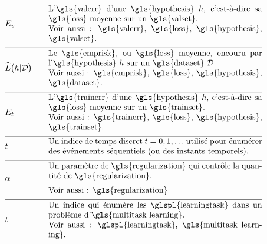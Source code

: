 \begin{align}
	& \valerror & \quad & \parbox{.75\textwidth}{L'\gls{valerr} d’une \gls{hypothesis} $\hypothesis$, c’est-à-dire sa \gls{loss} moyenne sur un \gls{valset}. \\ Voir aussi : \gls{valerr}, \gls{loss}, \gls{hypothesis}, \gls{valset}.} \nonumber \\[2mm] \hline \nonumber\\[-5mm]
	& \emperror\big(\hypothesis| \dataset \big) & \quad & \parbox{.75\textwidth}{Le \gls{emprisk}, ou \gls{loss} moyenne, encouru par l'\gls{hypothesis} $\hypothesis$ sur un \gls{dataset} $\dataset$. \\ Voir aussi : \gls{emprisk}, \gls{loss}, \gls{hypothesis}, \gls{dataset}.} \nonumber \\[2mm] \hline \nonumber\\[-5mm]
	& \trainerror & \quad & \parbox{.75\textwidth}{L’\gls{trainerr} d’une \gls{hypothesis} $\hypothesis$, c’est-à-dire sa \gls{loss} moyenne sur un \gls{trainset}. \\ Voir aussi : \gls{trainerr}, \gls{loss}, \gls{hypothesis}, \gls{trainset}.} \nonumber \\[2mm] \hline \nonumber\\[-5mm]
	& \timeidx & \quad & \parbox{.75\textwidth}{Un indice de temps discret $\timeidx=0,1,\ldots$ utilisé pour énumérer des événements séquentiels (ou des instants temporels).} \nonumber \\[2mm] \hline \nonumber\\[-5mm]
	& \regparam & \quad & \parbox{.75\textwidth}{
	Un paramètre de \gls{regularization} qui contrôle la quantité de \gls{regularization}. \\
	[2mm] Voir aussi : \gls{regularization}
	} \nonumber \\[2mm] \hline \nonumber\\[-5mm]
	& \taskidx & \quad & \parbox{.75\textwidth}{Un indice qui énumère les \glspl{learningtask} dans un problème d'\gls{multitask learning}. \\ Voir aussi : \glspl{learningtask}, \gls{multitask learning}.} \nonumber
\end{align}


